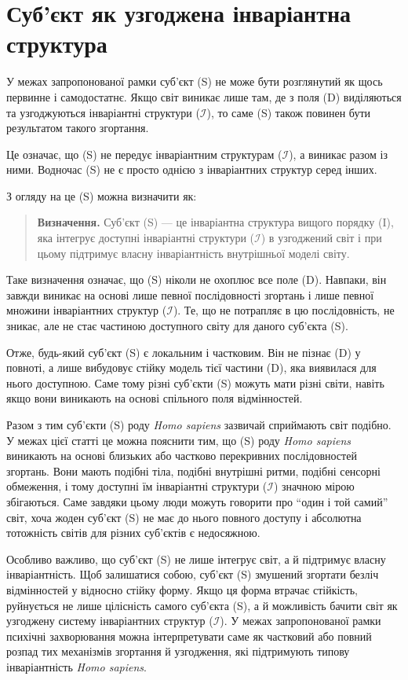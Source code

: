\documentclass[aps,prd,onecolumn,nofootinbib,superscriptaddress]{revtex4-2} %
\begin{document}
    \section{Суб’єкт як узгоджена інваріантна структура}
    У межах запропонованої рамки суб’єкт (S) не може бути розглянутий як щось первинне і самодостатнє. Якщо світ виникає лише там, де з поля (D) виділяються та узгоджуються інваріантні структури ($\mathcal{I}$), то саме (S) також повинен бути результатом такого згортання.

    Це означає, що (S) не передує інваріантним структурам ($\mathcal{I}$), а виникає разом із ними. Водночас (S) не є просто однією з інваріантних структур серед інших.

    З огляду на це (S) можна визначити як:
    \begin{quote}
        \textbf{Визначення.}
        Суб’єкт (S) — це інваріантна структура вищого порядку (I), яка інтегрує доступні інваріантні структури ($\mathcal{I}$) в узгоджений світ і при цьому підтримує власну інваріантність внутрішньої моделі світу.
    \end{quote}

    Таке визначення означає, що (S) ніколи не охоплює все поле (D). Навпаки, він завжди виникає на основі лише певної послідовності згортань і лише певної множини інваріантних структур ($\mathcal{I}$). Те, що не потрапляє в цю послідовність, не зникає, але не стає частиною доступного світу для даного суб’єкта (S).

    Отже, будь-який суб’єкт (S) є локальним і частковим. Він не пізнає (D) у повноті, а лише вибудовує стійку модель тієї частини (D), яка виявилася для нього доступною. Саме тому різні суб’єкти (S) можуть мати різні світи, навіть якщо вони виникають на основі спільного поля відмінностей.

    Разом з тим суб’єкти (S) роду \emph{Homo sapiens} зазвичай сприймають світ подібно. У межах цієї статті це можна пояснити тим, що (S) роду \emph{Homo sapiens} виникають на основі близьких або частково перекривних послідовностей згортань. Вони мають подібні тіла, подібні внутрішні ритми, подібні сенсорні обмеження, і тому доступні їм інваріантні структури ($\mathcal{I}$) значною мірою збігаються. Саме завдяки цьому люди можуть говорити про “один і той самий” світ, хоча жоден суб’єкт (S) не має до нього повного доступу і абсолютна тотожність світів для різних суб’єктів є недосяжною.

    Особливо важливо, що суб’єкт (S) не лише інтегрує світ, а й підтримує власну інваріантність. Щоб залишатися собою, суб’єкт (S) змушений згортати безліч відмінностей у відносно стійку форму. Якщо ця форма втрачає стійкість, руйнується не лише цілісність самого суб’єкта (S), а й можливість бачити світ як узгоджену систему інваріантних структур ($\mathcal{I}$). У межах запропонованої рамки психічні захворювання можна інтерпретувати саме як частковий або повний розпад тих механізмів згортання й узгодження, які підтримують типову інваріантність \emph{Homo sapiens}.
\end{document}
